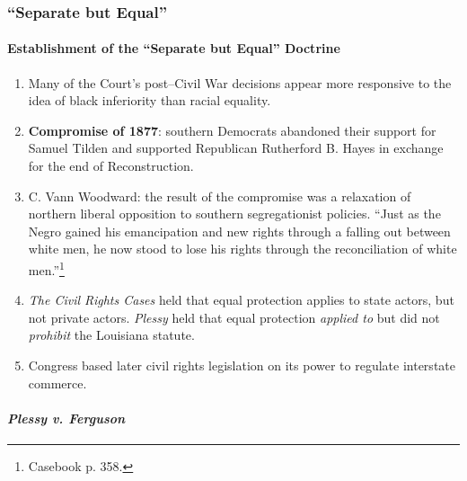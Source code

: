 % 
% 
% 
\subsubsection{``Separate but Equal''}

\paragraph{Establishment of the ``Separate but Equal'' Doctrine}

\begin{enumerate}
    \item Many of the Court's post--Civil War decisions appear more 
    responsive to the idea of black inferiority than racial equality.
    \item \textbf{Compromise of 1877}: southern Democrats abandoned their 
    support for Samuel Tilden and supported Republican Rutherford B. Hayes in 
    exchange for the end of Reconstruction.
    \item C. Vann Woodward: the result of the compromise was a relaxation of 
    northern liberal opposition to southern segregationist policies. ``Just as 
    the Negro gained his emancipation and new rights through a falling out 
    between white men, he now stood to lose his rights through the 
    reconciliation of white men.''\footnote{Casebook p. 358.}
    \item \emph{The Civil Rights Cases} held that equal protection applies to 
    state actors, but not private actors. \emph{Plessy} held that equal 
    protection \emph{applied to} but did not \emph{prohibit} the Louisiana 
    statute.
    \item Congress based later civil rights legislation on its power to 
    regulate interstate commerce.
\end{enumerate}

\paragraph{\emph{Plessy v. Ferguson}}


